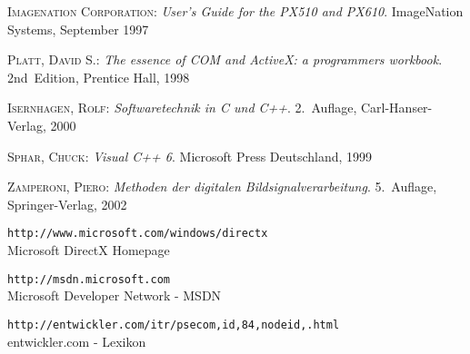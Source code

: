 
\begin{thebibliography}{99}

  \textsc{Imagenation Corporation}:
  \textsl{User's Guide for the PX510 and PX610}.
  ImageNation Systems, September 1997

  \textsc{Platt, David S.}:
  \textsl{The essence of COM and ActiveX: a programmers workbook}.
  2nd~Edition, Prentice Hall, 1998

  \textsc{Isernhagen, Rolf}:
  \textsl{Softwaretechnik in C und C++}.
  2.~Auflage, Carl-Hanser-Verlag, 2000

  \textsc{Sphar, Chuck}:
  \textsl{Visual C++ 6}.
  Microsoft Press Deutschland, 1999

  \textsc{Zamperoni, Piero}:
  \textsl{Methoden der digitalen Bildsignalverarbeitung}.
  5.~Auflage, Springer-Verlag, 2002

  \verb|http://www.microsoft.com/windows/directx|\\
  Microsoft DirectX Homepage

  \verb|http://msdn.microsoft.com|\\
  Microsoft Developer Network - MSDN

  \verb|http://entwickler.com/itr/psecom,id,84,nodeid,.html|\\
  entwickler.com - Lexikon

\end{thebibliography}
